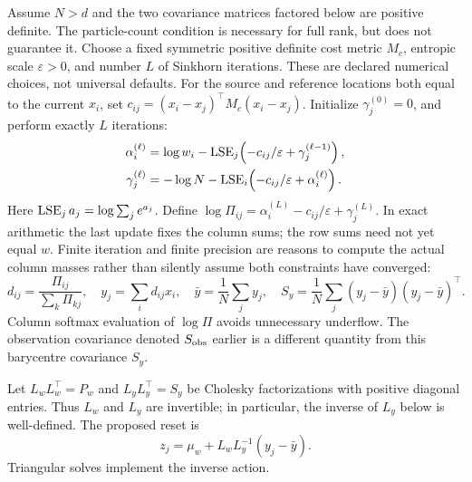 Assume \(N>d\) and the two covariance matrices factored below are positive
definite. The particle-count condition is necessary for full rank, but does
not guarantee it. Choose a fixed symmetric positive definite cost metric
\(M_c\), entropic scale \(\varepsilon>0\), and number \(L\) of Sinkhorn
iterations. These are declared numerical choices, not universal defaults.
For the source and reference locations both equal to the current \(x_i\), set
\(c_{ij}=(x_i-x_j)^\top M_c(x_i-x_j)\).
Initialize \(\gamma_j^{(0)}=0\), and perform exactly \(L\) iterations:
\begin{align}
\label{eq:bf-covariance-proposal-sinkhorn-iterations}
 \alpha_i^{(\ell)}
  &=\log w_i-\operatorname{LSE}_j\!\left(-c_{ij}/\varepsilon+
                                 \gamma_j^{(\ell-1)}\right),\\
 \gamma_j^{(\ell)}
  &=-\log N-\operatorname{LSE}_i\!\left(-c_{ij}/\varepsilon+
                                 \alpha_i^{(\ell)}\right).
 \nonumber
\end{align}
Here \(\operatorname{LSE}_j a_j=\log\sum_j e^{a_j}\). Define
\(\log\Pi_{ij}=\alpha_i^{(L)}-c_{ij}/\varepsilon+\gamma_j^{(L)}\).
In exact arithmetic the last update fixes the column sums; the row sums
need not yet equal \(w\). Finite iteration and finite precision are reasons
to compute the actual column masses rather than silently assume both
constraints have converged:
\begin{equation}
\label{eq:bf-covariance-proposal-actual-barycentres}
 d_{ij}=\frac{\Pi_{ij}}{\sum_k\Pi_{kj}},\quad
 y_j=\sum_i d_{ij}x_i,\quad
 \bar y=\frac1N\sum_j y_j,\quad
 S_y=\frac1N\sum_j(y_j-\bar y)(y_j-\bar y)^\top .
\end{equation}
Column softmax evaluation of \(\log\Pi\) avoids unnecessary underflow.
The observation covariance denoted \(S_{\rm obs}\) earlier is a different
quantity from this barycentre covariance \(S_y\).

Let \(L_wL_w^\top=P_w\) and \(L_yL_y^\top=S_y\) be Cholesky factorizations
with positive diagonal entries. Thus \(L_w\) and \(L_y\) are invertible;
in particular, the inverse of \(L_y\) below is well-defined.
The proposed reset is
\begin{equation}
\label{eq:bf-covariance-proposal-cholesky-reset}
 z_j=\mu_w+L_wL_y^{-1}(y_j-\bar y).
\end{equation}
Triangular solves implement the inverse action.

